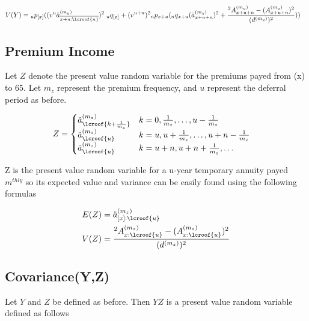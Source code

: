 \documentclass[12pt]{article}
\begin{document}
\begin{align*}
V(Y) &= \hspace{0mm}_up_{[x]}(
(v^{u}\ddot{a}_{\overline{x+u:\lcroof{n}}}^{(m_y)})^{2}\hspace{1mm}_uq_{[x]} +
(v^{u+n})^2\hspace{0mm}_np_{x+u}(\hspace{0mm}_nq_{x+u}
(\ddot{a}_{x+u+n}^{(m_y)})^2 + \frac{\hspace{0mm}^2A_{x+u+n}^{(m_y)} - (A_{x+u+n}^{(m_y)})^2}{(d^{(m_y)})^2})
)
\end{align*}

\subsection{Premium Income}

Let $Z$ denote the present value random variable for the premiums payed from (x) to 65. Let $m_z$ represent the premium frequency, and $u$ represent the deferral period as before.

\begin{align*}
Z &= 
\begin{cases}
\ddot{a}_{\lcroof{k+\frac{1}{m_z}}}^{(m_z)} & k=0,\frac{1}{m_z},\dots{}, u-\frac{1}{m_z} \\
\ddot{a}_{\lcroof{u}}^{(m_z)} & k=u,u+\frac{1}{m_z},\dots{},u+n-\frac{1}{m_z} \\
\ddot{a}_{\lcroof{u}}^{(m_z)} & k = u+n,u+n+\frac{1}{m_z}, \dots{}
\end{cases}
\end{align*}

Z is the present value random variable for a u-year temporary annuity payed $m^{thly}$ so its expected value and variance can be easily found using the following formulas

\begin{align*}
E(Z) &= \ddot{a}_{[x]:\lcroof{u}}^{(m_z)}\\
V(Z) &= \frac{\hspace{0mm}^2A_{x:\lcroof{u}}^{(m_z)} - (A_{x:\lcroof{u}}^{(m_z)})^{2}}{(d^{(m_z)})^2}
\end{align*}

\subsection{Covariance(Y,Z)}

Let $Y$ and $Z$ be defined as before. Then $YZ$ is a present value random variable defined as follows
\end{document}
